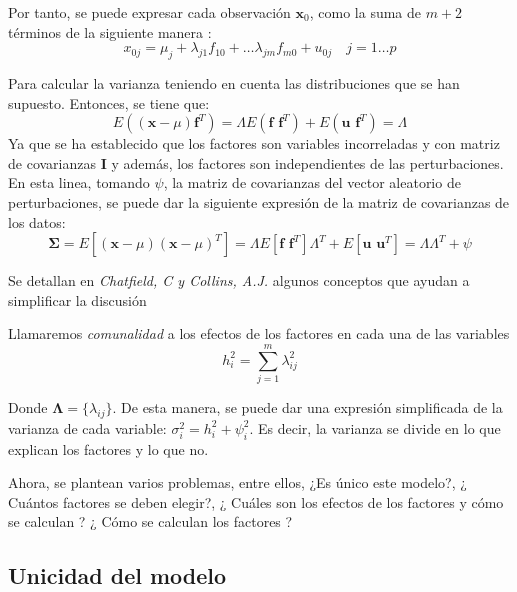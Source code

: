 \noindent Por tanto, se puede expresar cada observación $\textbf{x}_0$, como la suma de $m+2$ términos de la siguiente manera :
\begin{equation}
x_{0j}=\mu_j+\lambda_{j1}f_{10}+\ldots\lambda_{jm}f_{m0}+u_{0j}\quad j=1\ldots p
\end{equation}

\noindent Para calcular la varianza teniendo en cuenta las distribuciones que se han supuesto. Entonces, se tiene que:
\begin{equation}
E((\textbf{x}-\mu)\textbf{f}^T)=\Lambda E(\textbf{f }\textbf{f}^T)+E(\textbf{u f}^T)=\Lambda
\end{equation}
\noindent Ya que se ha establecido que los factores son variables incorreladas y con matriz de covarianzas \textbf{I} y además, los factores son independientes de las perturbaciones. En esta linea, tomando $\psi$, la matriz de covarianzas del vector aleatorio de perturbaciones, se puede dar la siguiente expresión de la matriz de covarianzas de los datos:
\begin{equation}
\mathbf{\Sigma}=E[(\textbf{x}-\mu)(\textbf{x}-\mu)^T]=\Lambda E[\textbf{f f}^T]\Lambda^T+E[\textbf{u u}^T] =\Lambda\Lambda^T+\psi
\end{equation}

\noindent Se detallan en \emph{Chatfield, C y Collins, A.J. }\cite{Chatfield 1989} algunos conceptos que ayudan a simplificar la discusión 
\begin{defi}
Llamaremos \emph{comunalidad} a los efectos de los factores en cada una de las variables 
\begin{equation}
h_i^2=\sum_{j=1}^m \lambda_{ij}^2
\end{equation}
\end{defi}
\noindent Donde $\mathbf{\Lambda}=\lbrace\lambda_{ij}\rbrace$. De esta manera, se puede dar una expresión simplificada de la varianza de cada variable: $\sigma^2_i =h_i^2+\psi_i^2$. Es decir, la varianza se divide en lo que explican los factores y lo que no. 

\noindent Ahora, se plantean varios problemas, entre ellos, ¿Es único este modelo?, ¿ Cuántos factores se deben elegir?, ¿ Cuáles son los efectos de los factores y cómo se calculan ? ¿ Cómo se calculan los factores ? 

\subsection{ Unicidad del modelo }

